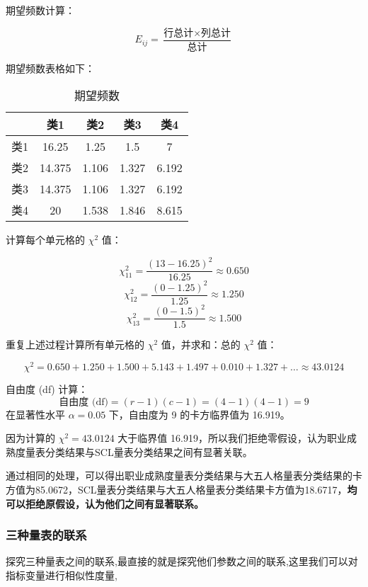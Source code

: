 \documentclass[withoutpreface,bwprint]{cumcmthesis} %
\begin{document}
期望频数计算：

\begin{equation}
    E_{ij} = \frac{\text{行总计} \times \text{列总计}}{\text{总计}}
    \label{eq:expected_frep}
\end{equation}

期望频数表格如下：

\begin{table}[htbp]
    \centering
    \begin{tabular}{|c|c|c|c|c|}
        \hline
        & 类1 & 类2 & 类3 & 类4 \\
        \hline
        类1 & 16.25 & 1.25 & 1.5 & 7 \\
        \hline
        类2 & 14.375 & 1.106 & 1.327 & 6.192 \\
        \hline
        类3 & 14.375 & 1.106 & 1.327 & 6.192 \\
        \hline
        类4 & 20 & 1.538 & 1.846 & 8.615 \\
        \hline
    \end{tabular}
    \caption{期望频数}
    \label{tab:expected}
\end{table}
计算每个单元格的 \(\chi^2\) 值：

\[
\chi^2_{11} = \frac{(13 - 16.25)^2}{16.25} \approx 0.650
\]
\[
\chi^2_{12} = \frac{(0 - 1.25)^2}{1.25} \approx 1.250
\]
\[
\chi^2_{13} = \frac{(0 - 1.5)^2}{1.5} \approx 1.500
\]

重复上述过程计算所有单元格的 \(\chi^2\) 值，并求和：总的 \(\chi^2\) 值：

\[
\chi^2 = 0.650 + 1.250 + 1.500 + 5.143 + 1.497 + 0.010 + 1.327 + \ldots \approx 43.0124
\]

自由度 (df) 计算：
\[
\text{自由度 (df)} = (r - 1)(c - 1) = (4 - 1)(4 - 1) = 9
\]
在显著性水平 \(\alpha = 0.05\) 下，自由度为 9 的卡方临界值为 16.919。

因为计算的 \(\chi^2 = 43.0124\) 大于临界值 16.919，所以我们拒绝零假设，认为职业成熟度量表分类结果与SCL量表分类结果之间有显著关联。

通过相同的处理，可以得出职业成熟度量表分类结果与大五人格量表分类结果的卡方值为85.0672，SCL量表分类结果与大五人格量表分类结果卡方值为18.6717，\textbf{均可以拒绝原假设，认为他们之间有显著联系。}


\subsubsection{三种量表的联系}

探究三种量表之间的联系,最直接的就是探究他们参数之间的联系,这里我们可以对指标变量进行相似性度量,
\end{document}
